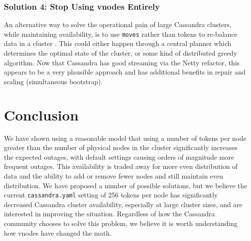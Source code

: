 \documentclass{article}
\begin{document}
\subsubsection{Solution 4: Stop Using vnodes Entirely}
An alternative way to solve the operational pain of large Cassandra clusters,
while maintaining availability, is to use \texttt{moves} rather than
tokens to re-balance data in a cluster \cite{moves}\cite{movesp}. This
could either happen through a central planner which determines the
optimal state of the cluster, or some kind of distributed greedy
algorithm. Now that Cassandra has good streaming via the Netty refactor,
this appears to be a very plausible approach and has additional benefits
in repair and scaling (simultaneous bootstrap).

\section{Conclusion}

We have shown using a reasonable model that using a number of tokens per node
greater than the number of physical nodes in the cluster significantly increases
the expected outages, with default settings causing orders of magnitude more
frequent outages. This availability is traded away for more even distribution
of data and the ability to add or remove fewer nodes and still maintain even
distribution. We have proposed a number of possible solutions, but we believe
the current \texttt{cassandra.yaml} setting of 256 tokens per node has
significantly decreased Cassandra cluster availability, especially at large
cluster sizes, and are interested in improving the situation. Regardless of
how the Cassandra community chooses to solve this problem, we believe it is
worth understanding how vnodes have changed the math.
\end{document}
